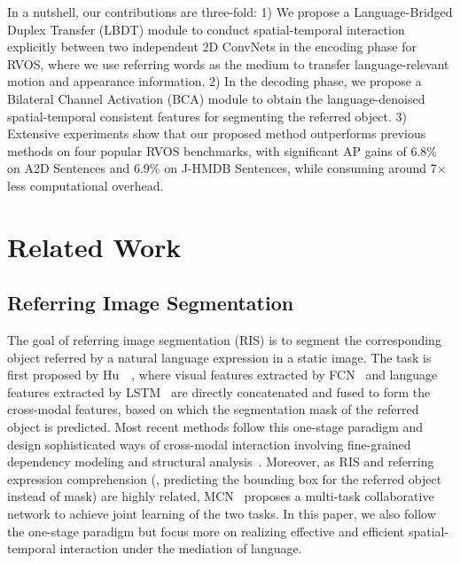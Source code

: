 \documentclass[10pt,twocolumn,letterpaper]{article}
\begin{document}
In a nutshell, our contributions are three-fold:
1) We propose a Language-Bridged Duplex Transfer (LBDT) module to conduct spatial-temporal interaction explicitly between two independent 2D ConvNets in the encoding phase for RVOS, where we use referring words as the medium to transfer language-relevant motion and appearance information.
2) In the decoding phase, we propose a Bilateral Channel Activation (BCA) module to obtain the language-denoised spatial-temporal consistent features for segmenting the referred object.
3) Extensive experiments show that our proposed method outperforms previous methods on four popular RVOS benchmarks, with significant AP gains of 6.8\% on A2D Sentences and 6.9\% on J-HMDB Sentences, while consuming around 7$\times$ less computational overhead. 



\section{Related Work}
\label{sec:related}

\subsection{Referring Image Segmentation}
\label{sec:related:ris}

The goal of referring image segmentation (RIS) is to segment the corresponding object referred by a natural language expression in a static image. The task is first proposed by Hu~\etal~\cite{hu2016segmentation}, where visual features extracted by FCN~\cite{long2015fully} and language features extracted by LSTM~\cite{hochreiter1997long} are directly concatenated and fused to form the cross-modal features, based on which the segmentation mask of the referred object is predicted.
Most recent methods follow this one-stage paradigm and design sophisticated ways of cross-modal interaction involving fine-grained dependency modeling and structural analysis~\cite{li2018referring,ye2021referring,jing2021locate,huang2020referring,hui2020linguistic}. Moreover, as RIS and referring expression comprehension (\ie, predicting the bounding box for the referred object instead of mask) are highly related, MCN~\cite{luo2020multi} proposes a multi-task collaborative network to achieve joint learning of the two tasks.
In this paper, we also follow the one-stage paradigm but focus more on realizing effective and efficient spatial-temporal interaction under the mediation of language.
\end{document}
